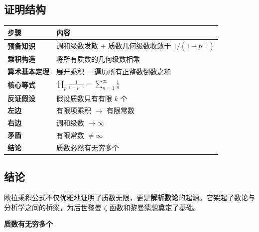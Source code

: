 \documentclass[11pt,a4paper]{ctexart}
\newcommand{\highlight}[1]{\colorbox{accent!20}{\sffamily\bfseries #1}}
\begin{document}
\begin{summarybox}

\subsection*{证明结构}

\begin{center}
\begin{tabular}{@{}>{\sffamily\bfseries}p{3cm} p{11cm}@{}}
\toprule
\textbf{步骤} & \textbf{内容} \\
\midrule
预备知识   & 调和级数发散 + 质数几何级数收敛于 $1/(1-p^{-1})$ \\
乘积构造   & 将所有质数的几何级数相乘 \\
算术基本定理 & 展开乘积 = 遍历所有正整数倒数之和 \\
核心等式   & $\displaystyle \prod_{p}\frac{1}{1-p^{-1}} = \sum_{n=1}^{\infty}\frac{1}{n}$ \\
反证假设   & 假设质数只有有限 $k$ 个 \\
左边       & 有限项乘积 $\to$ 有限常数 \\
右边       & 调和级数 $\to \infty$ \\
矛盾       & 有限常数 $\neq \infty$ \\
结论       & 质数必然有无穷多个 \\
\bottomrule
\end{tabular}
\end{center}

\vspace{1em}

\subsection*{结论}

欧拉乘积公式不仅优雅地证明了质数无限，更是\highlight{解析数论}的起源。它架起了数论与分析学之间的桥梁，为后世黎曼 $\zeta$ 函数和黎曼猜想奠定了基础。

\begin{center}
\begin{tcolorbox}[
  enhanced, colframe=accent!80, colback=accent!10,
  sharp corners, boxrule=1.5pt, width=10cm, center,
]
  {\color{maincolor}\sffamily\bfseries\Large 质数有无穷多个}
\end{tcolorbox}
\end{center}

\end{summarybox}
\end{document}

